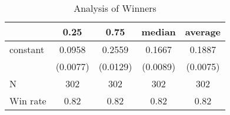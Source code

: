 \begin{table}
\caption{Analysis of Winners}
\begin{center}
\begin{tabular}{lcccc}
\hline
         &   0.25   &   0.75   &  median  & average   \\
\midrule
\midrule
constant & 0.0958   & 0.2559   & 0.1667   & 0.1887    \\
         & (0.0077) & (0.0129) & (0.0089) & (0.0075)  \\
N        & 302      & 302      & 302      & 302       \\
Win rate & 0.82     & 0.82     & 0.82     & 0.82      \\
\hline
\end{tabular}
\end{center}
\end{table}